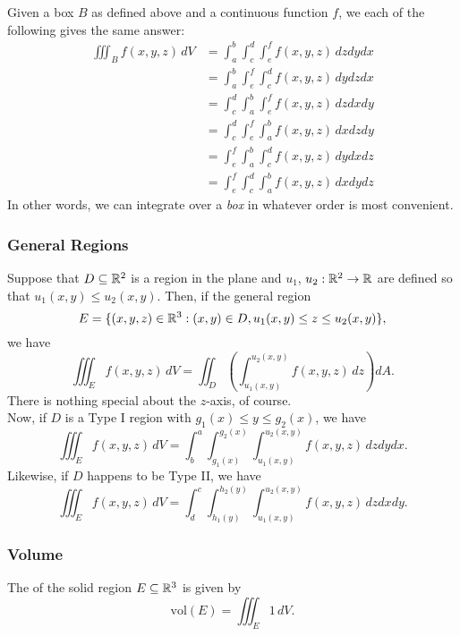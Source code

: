 Given a box \(B\) as defined above and a continuous function \(f\), we each of the following gives the same answer:
\begin{align*}
  \iiint_B f(x, y, z) \, dV & = \int_a^b \int_c^d \int_e^f f(x, y, z) \, dz dy dx \\
                            & = \int_a^b \int_e^f \int_c^d f(x, y, z) \, dy dz dx \\
                            & = \int_c^d \int_a^b \int_e^f f(x, y, z) \, dz dx dy \\
                            & = \int_c^d \int_e^f \int_a^b f(x, y, z) \, dx dz dy \\
                            & = \int_e^f \int_a^b \int_c^d f(x, y, z) \, dy dx dz \\
                            & = \int_e^f \int_c^d \int_a^b f(x, y, z) \, dx dy dz
\end{align*}
In other words, we can integrate over a \textit{box} in whatever order is most convenient.

\newpage

\subsubsection{General Regions}

Suppose that \(D \subseteq \mathbb{R}^2\) is a region in the plane and \(u_1\), \(u_2 : \mathbb{R}^2 \to \mathbb{R}\) are defined so that \(u_1(x, y) \leq u_2(x, y)\). Then, if the general region
\[
  E = \{(x, y, z) \in \mathbb{R}^3 : (x, y) \in D, u_1(x, y) \leq z \leq u_2(x, y)\},
\]
we have
\[
  \iiint_E f(x, y, z) \, dV = \iint_D \left( \int_{u_1(x, y)}^{u_2(x, y)} f(x, y, z) \, dz \right) dA.
\]
There is nothing special about the \(z\)-axis, of course. \\

Now, if \(D\) is a Type I region with \(g_1(x) \leq y \leq g_2(x)\), we have
\[
  \iiint_E f(x, y, z) \, dV = \int_b^a \int_{g_1(x)}^{g_2(x)} \int_{u_1(x, y)}^{u_2(x, y)} f(x, y, z) \, dz dy dx.
\]
Likewise, if \(D\) happens to be Type II, we have
\[
  \iiint_E f(x, y, z) \, dV = \int_d^c \int_{h_1(y)}^{h_2(y)} \int_{u_1(x, y)}^{u_2(x, y)} f(x, y, z) \, dz dx dy.
\]

\subsubsection{Volume}

The  of the solid region \(E \subseteq \mathbb{R}^3\) is given by
\[
  \text{vol}(E) = \iiint_E 1 \, dV.
\]

